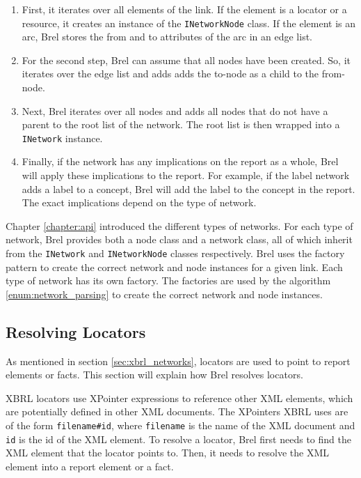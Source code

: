 \begin{enumerate}\label{enum:network_parsing}
    \item First, it iterates over all elements of the link. 
    If the element is a locator or a resource, it creates an instance of the \texttt{INetworkNode} class.
    If the element is an arc, Brel stores the from and to attributes of the arc in an edge list.
    \item For the second step, Brel can assume that all nodes have been created.
    So, it iterates over the edge list and adds adds the to-node as a child to the from-node.
    \item Next, Brel iterates over all nodes and adds all nodes that do not have a parent to the root list of the network.
    The root list is then wrapped into a \texttt{INetwork} instance.
    \item Finally, if the network has any implications on the report as a whole, Brel will apply these implications to the report.
    For example, if the label network adds a label to a concept, Brel will add the label to the concept in the report.
    The exact implications depend on the type of network.
\end{enumerate}

Chapter \ref{chapter:api} introduced the different types of networks.
For each type of network, Brel provides both a node class and a network class, 
all of which inherit from the \texttt{INetwork} and \texttt{INetworkNode} classes respectively.
Brel uses the factory pattern to create the correct network and node instances for a given link.
Each type of network has its own factory.
The factories are used by the algorithm \ref{enum:network_parsing} to create the correct network and node instances.

\subsection{Resolving Locators}

As mentioned in section \ref{sec:xbrl_networks}, locators are used to point to report elements or facts.
This section will explain how Brel resolves locators.

XBRL locators use XPointer\cite{w3_xpointer} expressions to reference other XML elements, which are potentially defined in other XML documents.
The XPointers XBRL uses are of the form \texttt{filename\#id},
where \texttt{filename} is the name of the XML document and \texttt{id} is the id of the XML element.
To resolve a locator, Brel first needs to find the XML element that the locator points to.
Then, it needs to resolve the XML element into a report element or a fact.

